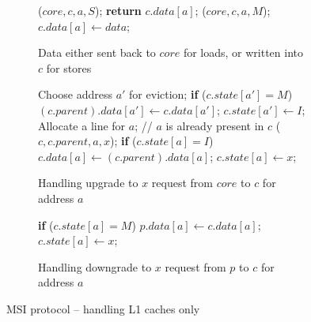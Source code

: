 \begin{figure}
\small

\begin{subfigure}{\linewidth}
\begin{boxedminipage}{\linewidth}
\begin{algorithmic}
    \State \call{} \uReq($core, c, a, S$);
    \State \textbf{return} $c.data[a]$;
    \State \call{} \uReq($core, c, a, M$);
    \State $c.data[a] \gets data$;
  \EndIf
\EndProc
\end{algorithmic}
\end{boxedminipage}
\caption{Data either sent back to $core$ for loads, or written into $c$ for stores}
\label{coreHandle}
\end{subfigure}

\begin{subfigure}{\linewidth}
\begin{boxedminipage}{\linewidth}
\begin{algorithmic}
        \State Choose address $a'$ for eviction;
        \State \textbf{if} ($c.state[a'] = M$)
        \State \;\;\;\; $(c.parent).data[a'] \gets c.data[a']$;
        \State $c.state[a'] \gets I$;
      \EndIf
      \State Allocate a line for $a$;
    \EndIf
    \State // $a$ is already present in $c$
    \State \call{} \uReq($c, c.parent, a, x$);
    \State \textbf{if} ($c.state[a] = I$)
    \State \;\;\;\; $c.data[a] \gets (c.parent).data[a]$;
    \State $c.state[a] \gets x$;
  \EndIf
\EndProc
\end{algorithmic}
\end{boxedminipage}
\caption{Handling upgrade to $x$ request from $core$ to $c$ for address $a$}
\label{uReq1Core}
\end{subfigure}

\begin{subfigure}{\linewidth}
\begin{boxedminipage}{\linewidth}
\begin{algorithmic}
    \State \textbf{if} ($c.state[a] = M$)
    \State \;\;\;\; $p.data[a] \gets c.data[a]$;
    \State $c.state[a] \gets x$;
  \EndIf
\EndProc
\end{algorithmic}
\end{boxedminipage}
\caption{Handling downgrade to $x$ request from $p$ to $c$ for address $a$}
\label{dReq1Core}
\end{subfigure}

\caption{MSI protocol -- handling L1 caches only}
\label{msi-simple-core}
\end{figure}

